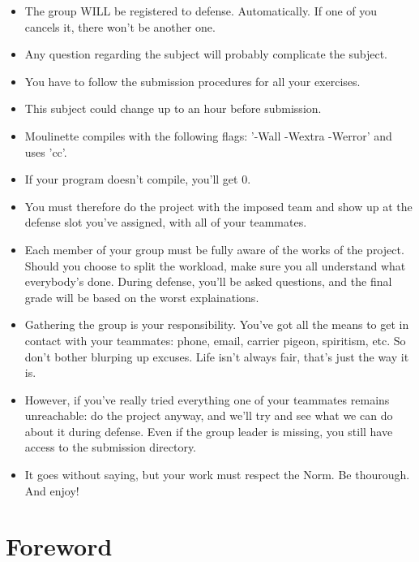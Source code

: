 \documentclass[12pt]{article}
\begin{document}
\begin{itemize}
  \item The group WILL be registered to defense. Automatically. If one of you cancels it, there won't be another one.
  \item Any question regarding the subject will probably complicate the subject.
  \item You have to follow the submission procedures for all your exercises.
  \item This subject could change up to an hour before submission.
  \item Moulinette compiles with the following flags: '-Wall -Wextra -Werror' and uses 'cc'.
  \item If your program doesn't compile, you'll get 0.
  \item You must therefore do the project with the imposed team and show up at the defense slot you've assigned, with all of your teammates.
  \item Each member of your group must be fully aware of the works of the project. Should you choose to split the workload, make sure you all understand what everybody's done. During defense, you'll be asked questions, and the final grade will be based on the worst explainations.
  \item Gathering the group is your responsibility. You've got all the means to get in contact with your teammates: phone, email, carrier pigeon, spiritism, etc. So don't bother blurping up excuses. Life isn't always fair, that's just the way it is.
  \item However, if you've really tried everything one of your teammates remains unreachable: do the project anyway, and we'll try and see what we can do about it during defense. Even if the group leader is missing, you still have access to the submission directory.
  \item It goes without saying, but your work must respect the Norm. Be thourough. And enjoy!
\end{itemize}

\newpage

\section{Foreword}
\end{document}
